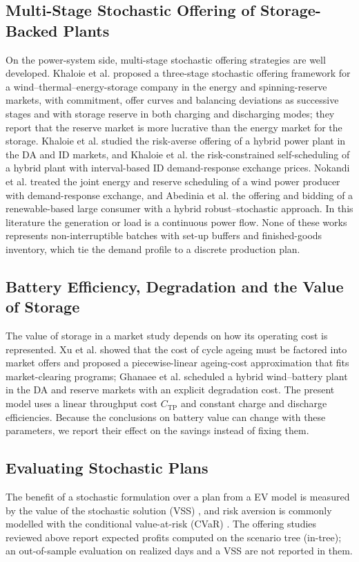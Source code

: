 \documentclass[5p,times,twocolumn]{elsarticle}
\begin{document}
\subsection{Multi-Stage Stochastic Offering of Storage-Backed Plants}
On the power-system side, multi-stage stochastic offering strategies are well developed. Khaloie et al. \cite{Khaloie2020} proposed a three-stage stochastic offering framework for a wind--thermal--energy-storage company in the energy and spinning-reserve markets, with commitment, offer curves and balancing deviations as successive stages and with storage reserve in both charging and discharging modes; they report that the reserve market is more lucrative than the energy market for the storage. Khaloie et al. \cite{Khaloie2021} studied the risk-averse offering of a hybrid power plant in the DA and ID markets, and Khaloie et al. \cite{Khaloie2021rk} the risk-constrained self-scheduling of a hybrid plant with interval-based ID demand-response exchange prices. Nokandi et al. \cite{nokandi2024} treated the joint energy and reserve scheduling of a wind power producer with demand-response exchange, and Abedinia et al. \cite{abedinia2019} the offering and bidding of a renewable-based large consumer with a hybrid robust--stochastic approach. In this literature the generation or load is a continuous power flow. None of these works represents non-interruptible batches with set-up buffers and finished-goods inventory, which tie the demand profile to a discrete production plan.

\subsection{Battery Efficiency, Degradation and the Value of Storage}
The value of storage in a market study depends on how its operating cost is represented. Xu et al. \cite{xu2018} showed that the cost of cycle ageing must be factored into market offers and proposed a piecewise-linear ageing-cost approximation that fits market-clearing programs; Ghanaee et al. \cite{Ghanaee2024} scheduled a hybrid wind--battery plant in the DA and reserve markets with an explicit degradation cost. The present model uses a linear throughput cost $C_{\text{TP}}$ and constant charge and discharge efficiencies. Because the conclusions on battery value can change with these parameters, we report their effect on the savings instead of fixing them.

\subsection{Evaluating Stochastic Plans}
The benefit of a stochastic formulation over a plan from a EV model is measured by the value of the stochastic solution (VSS) \cite{birge1982,Birge2011}, and risk aversion is commonly modelled with the conditional value-at-risk (CVaR) \cite{rockafellar2000optimization}. The offering studies reviewed above report expected profits computed on the scenario tree (in-tree); an out-of-sample evaluation on realized days and a VSS are not reported in them.
\end{document}
